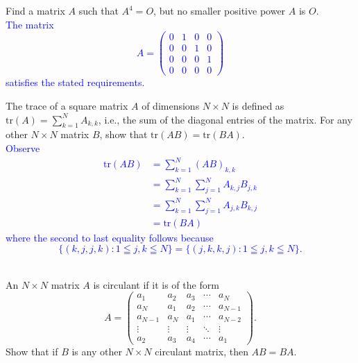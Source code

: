 \documentclass[a4paper,11pt]{article}
\newcommand{\BB}[1]{\textcolor{blue}{#1}}
\begin{document}
 Find a matrix $A$ such that $A^4=O$, but no
smaller positive power $A$ is $O$. \\

\BB{The matrix
  \[
    A=\begin{pmatrix}
        0 & 1 & 0 & 0 \\
        0 & 0 & 1 & 0 \\
        0 & 0 & 0 & 1 \\
        0 & 0 & 0 & 0
      \end{pmatrix}
  \]
  satisfies the stated requirements.\\}

 The trace of a square matrix $A$ of dimensions
$N \times N$ is defined as $\text{tr}(A)=\sum_{k=1}^NA_{k,k}$, i.e., the sum of
the diagonal entries of the matrix. For any other $N \times N$ matrix $B$, show
that $\text{tr}(AB)=\text{tr}(BA)$. \\

\BB{Observe
  \begin{align*}
    \text{tr}(AB) &= \sum_{k=1}^N(AB)_{k,k} \\
                  &= \sum_{k=1}^N\sum_{j=1}^NA_{k,j}B_{j,k} \\
                  &= \sum_{k=1}^N\sum_{j=1}^NA_{j,k}B_{k,j} \\
                  &= \text{tr}(BA)
  \end{align*}
  where the second to last equality follows because
  \[
    \{(k,j,j,k) : 1 \leqq j,k \leqq N\} =
    \{(j,k,k,j) : 1 \leqq j,k \leqq N\}.
  \] \\
}

 An $N \times N$ matrix $A$ is circulant if it is
of the form
\[
  A=\begin{pmatrix}
      a_1 & a_2 & a_3 & \cdots & a_N \\
      a_N & a_1 & a_2 & \cdots & a_{N-1} \\
      a_{N-1} & a_N & a_1 & \cdots & a_{N-2} \\
      \vdots & \vdots & \vdots & \ddots & \vdots \\
      a_2 & a_3 & a_4 & \cdots & a_1
    \end{pmatrix}.
\]
Show that if $B$ is any other $N \times N$ circulant matrix, then $AB=BA$. \\
\end{document}

